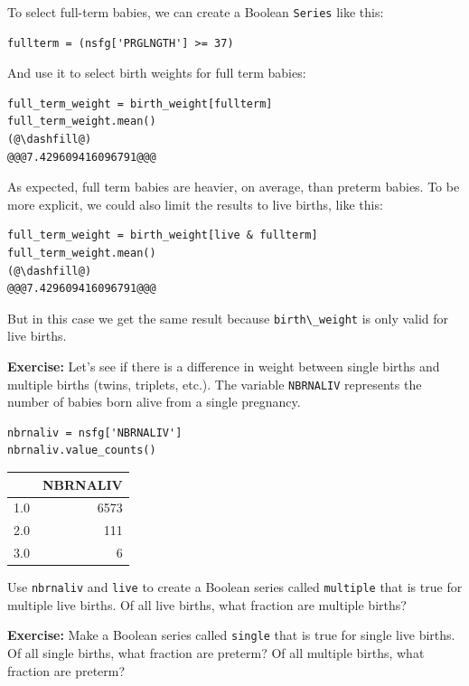 To select full-term babies, we can create a Boolean
\passthrough{\lstinline!Series!} like this:

\begin{lstlisting}[]
fullterm = (nsfg['PRGLNGTH'] >= 37)
\end{lstlisting}

And use it to select birth weights for full term babies:

\begin{lstlisting}[]
full_term_weight = birth_weight[fullterm]
full_term_weight.mean()
(@\dashfill@)
@@@7.429609416096791@@@
\end{lstlisting}

As expected, full term babies are heavier, on average, than preterm
babies. To be more explicit, we could also limit the results to live
births, like this:

\begin{lstlisting}[]
full_term_weight = birth_weight[live & fullterm]
full_term_weight.mean()
(@\dashfill@)
@@@7.429609416096791@@@
\end{lstlisting}

But in this case we get the same result because
\passthrough{\lstinline!birth\_weight!} is only valid for live births.

\textbf{Exercise:} Let's see if there is a difference in weight between
single births and multiple births (twins, triplets, etc.). The variable
\passthrough{\lstinline!NBRNALIV!} represents the number of babies born
alive from a single pregnancy.

\begin{lstlisting}[]
nbrnaliv = nsfg['NBRNALIV']
nbrnaliv.value_counts()
\end{lstlisting}

\begin{tabular}{lr}
\midrule
{} &  NBRNALIV \\
\midrule
1.0 &      6573 \\
2.0 &       111 \\
3.0 &         6 \\
\midrule
\end{tabular}

Use \passthrough{\lstinline!nbrnaliv!} and
\passthrough{\lstinline!live!} to create a Boolean series called
\passthrough{\lstinline!multiple!} that is true for multiple live
births. Of all live births, what fraction are multiple births?

\textbf{Exercise:} Make a Boolean series called
\passthrough{\lstinline!single!} that is true for single live births. Of
all single births, what fraction are preterm? Of all multiple births,
what fraction are preterm?

